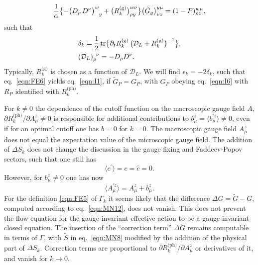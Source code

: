 \documentclass[twocolumn,aps,prd,amsmath,amssymb,preprintnumbers,longbibliography]{revtex4-1}
\numberwithin{equation}{section}
\DeclareMathOperator{\tr}{tr}
\newenvironment{alignedeqn}{\begin{equation}\begin{aligned}}{\end{aligned}\end{equation}\ignorespacesafterend}
\begin{document}
\begin{appendices}
\begin{equation}\label{eqn:FE10}
	\frac{1}{\alpha} \bigl\{-\tensor{\bigl(D_\rho \, D^\nu\bigr)}{^w_y} + \bigl(R_k^\text{(g)}\bigr)_{\rho y}^{w \nu}\bigr\} \bigl(\tilde{G}_g\bigr)_{\nu z}^{y \mu}
	= (1 - P)_{\rho z}^{w \mu},
\end{equation}
such that
\begin{alignedeqn}\label{eqn:FE11}
	&\delta_k
	= \frac{1}{2} \tr\bigl\{\partial_t R_k^\text{(g)} \, \bigl(\mathcal{D}_L + R_k^\text{(g)}\bigr)^{-1}\bigr\},\\
	&\tensor{(\mathcal{D}_L)}{_\rho^\nu}
	= -D_\rho D^\nu.
\end{alignedeqn}
Typically, $R_k^\text{(g)}$ is chosen as a function of $\mathcal{D}_L$. We will find $\epsilon_k = -2 \delta_k$, such that eq.~\eqref{eqn:FE6} yields eq.~\eqref{eqn:I1}, if $\tilde{G}_P = G_P$, with $G_P$ obeying eq.~\eqref{eqn:I6} with $R_P$ identified with $R_k^\text{(ph)}$.

For $k \neq 0$ the dependence of the cutoff function on the macroscopic gauge field $A$, $\partial R_k^\text{(ph)}/\partial A_\mu^z \neq 0$ is responsible for additional contributions to $b_\mu^z = \langle b_\mu^{\prime z}\rangle \neq 0$, even if for an optimal cutoff one has $b = 0$ for $k = 0$. The macroscopic gauge field $A_\mu^z$ does not equal the expectation value of the microscopic gauge field. The addition of $\Delta S_k$ does not change the discussion in the gauge fixing and Faddeev-Popov sectors, such that one still has
\begin{equation}\label{eqn:FE12}
	\langle c^\prime\rangle
	= c
	= \hat{c}
	= 0.
\end{equation}
However, for $b_\mu^z \neq 0$ one has now
\begin{equation}
	\langle A_\mu^{\prime z}\rangle
	= A_\mu^z + b_\mu^z.
\end{equation}
For the definition \eqref{eqn:FE5} of $\Gamma_k$ it seems likely that the difference $\Delta G = \tilde{G} - G$, computed according to eq.~\eqref{eqn:MN12}, does not vanish. This does not prevent the flow equation for the gauge-invariant effective action to be a gauge-invariant closed equation. The insertion of the ``correction term'' $\Delta G$ remains computable in terms of $\Gamma$, with $\tilde{S}$ in eq.~\eqref{eqn:MN8} modified by the addition of the physical part of $\Delta S_k$. Correction terms are proportional to $\partial R_k^\text{(ph)}/\partial A_\mu^z$ or derivatives of it, and vanish for $k \to 0$.


\end{appendices}
\end{document}
